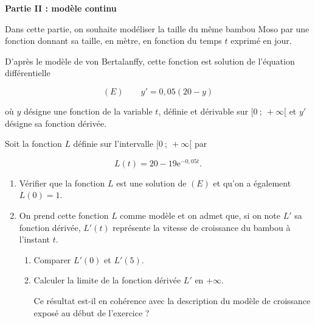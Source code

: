 \documentclass[10pt]{article}
\providecommand{\e}{{\mathrm{e}}}
\begin{document}
\bigskip

\textbf{Partie II : modèle continu}

\medskip

Dans cette partie, on souhaite modéliser la taille du même bambou Moso par une fonction donnant sa taille, en mètre, en fonction du temps $t$ exprimé en jour. 

D'après le modèle de von Bertalanffy, cette fonction est solution de l'équation différentielle

\[(E) \qquad y' = 0,05(20 - y)\]

où $y$ désigne une fonction de la variable $t$, définie et dérivable sur $[0~;~+\infty[$ et $y'$ désigne sa fonction dérivée.

Soit la fonction $L$ définie sur l'intervalle $[0~;~+\infty[$ par 

\[L(t) = 20 - 19\e^{-0,05t}.\]

\smallskip

\begin{enumerate}
\item Vérifier que la fonction $L$ est une solution de $(E)$ et qu'on a également $L(0) = 1$.
\item On prend cette fonction $L$ comme modèle et on admet que, si on note $L'$ sa fonction dérivée,
$L'(t)$ représente la vitesse de croissance du bambou à l'instant $t$.
	\begin{enumerate}
		\item Comparer $L'(0)$ et $L'(5)$.
		\item Calculer la limite de la fonction dérivée $L'$ en $+\infty$. 
		
Ce résultat est-il en cohérence avec la description du modèle de croissance exposé au début de l'exercice ?
	\end{enumerate}
\end{enumerate}

\bigskip
\end{document}
